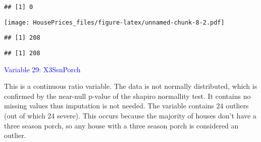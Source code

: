 \documentclass[
]{article}
\newenvironment{Shaded}{\begin{snugshade}}{\end{snugshade}}
\newcommand{\AttributeTok}[1]{\textcolor[rgb]{0.13,0.29,0.53}{#1}}
\newcommand{\CommentTok}[1]{\textcolor[rgb]{0.56,0.35,0.01}{\textit{#1}}}
\newcommand{\ConstantTok}[1]{\textcolor[rgb]{0.56,0.35,0.01}{#1}}
\newcommand{\DecValTok}[1]{\textcolor[rgb]{0.00,0.00,0.81}{#1}}
\newcommand{\FloatTok}[1]{\textcolor[rgb]{0.00,0.00,0.81}{#1}}
\newcommand{\FunctionTok}[1]{\textcolor[rgb]{0.13,0.29,0.53}{\textbf{#1}}}
\newcommand{\NormalTok}[1]{#1}
\newcommand{\OtherTok}[1]{\textcolor[rgb]{0.56,0.35,0.01}{#1}}
\newcommand{\SpecialCharTok}[1]{\textcolor[rgb]{0.81,0.36,0.00}{\textbf{#1}}}
\begin{document}
\begin{verbatim}
## [1] 0
\end{verbatim}

\begin{Shaded}
\end{Shaded}

\texttt{[image: HousePrices\_files/figure-latex/unnamed-chunk-8-2.pdf]}

\begin{verbatim}
## [1] 208
\end{verbatim}

\begin{Shaded}
\end{Shaded}

\begin{verbatim}
## [1] 208
\end{verbatim}

\textcolor{blue}{Variable 29: X3SsnPorch}

This is a continuous ratio variable. The data is not normally
distributed, which is confirmed by the near-null p-value of the shapiro
normallity test. It contains no missing values thus imputation is not
needed. The variable contains 24 outliers (out of which 24 severe). This
occurs because the majority of houses don't have a three season porch,
so any house with a three season porch is considered an outlier.
\end{document}

